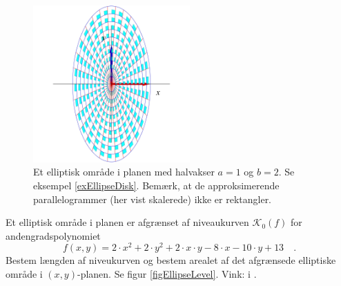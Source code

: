 \begin{figure}[ht]
\centerline{\includegraphics[height=60mm]{FIGS/plotEllipseDisk}}
\begin{center}
\caption{\small{Et elliptisk område i planen med halvakser $a=1$ og $b=2$. Se
eksempel \ref{exEllipseDisk}.
Bemærk, at de approksimerende parallelogrammer (her vist skalerede) ikke er rektangler.}} \label{figEllipseDisk}
\end{center}
\end{figure}

\begin{exercise} \label{exercEllipseLevel}
Et elliptisk område i planen er afgrænset af niveaukurven $\mathcal{K}_{0}(f)$ for andengradspolynomiet
\begin{equation}
f(x,y) = 2\cdot x^{2} + 2\cdot y^{2} + 2\cdot x\cdot y -8\cdot x -10 \cdot y + 13 \quad.
\end{equation}
Bestem længden af niveukurven og bestem arealet af det afgrænsede elliptiske område i $(x,y)$-planen. Se figur \ref{figEllipseLevel}. Vink:  i .
\end{exercise}

